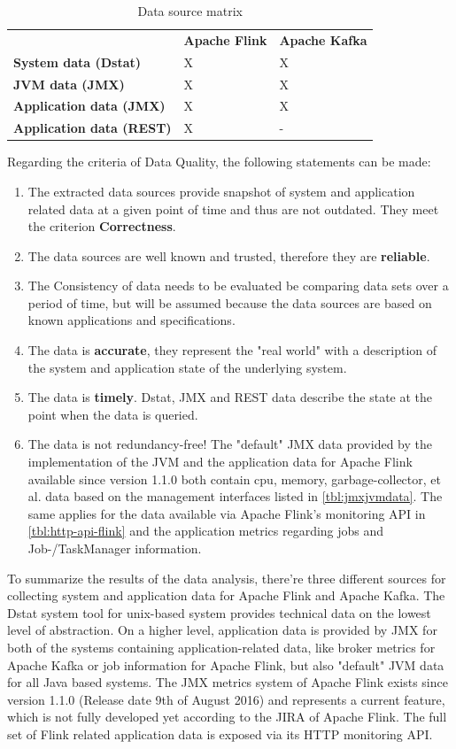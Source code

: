 \begin{table}[H]
\begin{tabular}{lll}
 & \textbf{Apache Flink} & \textbf{Apache Kafka} \\
\textbf{System data (Dstat)} & X & X \\
\textbf{JVM data (JMX)} & X & X \\
\textbf{Application data (JMX)} & X & X \\
\textbf{Application data (REST)} & X & - \\
\end{tabular}
\caption{Data source matrix}
\label{tbl:data-source-matrix}
\end{table}

Regarding the criteria of Data Quality, the following statements can be made:

\begin{enumerate}
    \item The extracted data sources provide snapshot of system and application related data at a
    given point of time and thus are not outdated. They meet the criterion \textbf{Correctness}.
    \item The data sources are well known and trusted, therefore they are \textbf{reliable}.
    \item The Consistency of data needs to be evaluated be comparing data sets over a period of time,
    but will be assumed because the data sources are based on known applications and specifications.
    \item The data is \textbf{accurate}, they represent the "real world" with a description of the system and application
    state of the underlying system.
    \item The data is \textbf{timely}. Dstat, JMX and REST data describe the state at the point when the data is
    queried.
    \item The data is not redundancy-free! The "default" JMX data provided by the implementation of the JVM and the
    application data for Apache Flink available since version 1.1.0 both contain cpu, memory, garbage-collector, et al.
    data based on the management interfaces listed in \autoref{tbl:jmxjvmdata}. The same applies for the data available
    via Apache Flink's monitoring API in \autoref{tbl:http-api-flink} and the application metrics regarding jobs and Job-/TaskManager information.
\end{enumerate}

To summarize the results of the data analysis, there're three different sources for collecting system and application
data for Apache Flink and Apache Kafka. The Dstat system tool for unix-based system provides technical data on the
lowest level of abstraction. On a higher level, application data is provided by JMX for both of the systems containing
application-related data, like broker metrics for Apache Kafka or job information for Apache Flink, but also "default"
JVM data for all Java based systems. The JMX metrics system of Apache Flink exists since version 1.1.0 (Release date
9th of August 2016) and represents a current feature, which is not fully developed yet according to the JIRA of
Apache Flink. The full set of Flink related application data is exposed via its HTTP
monitoring API.

